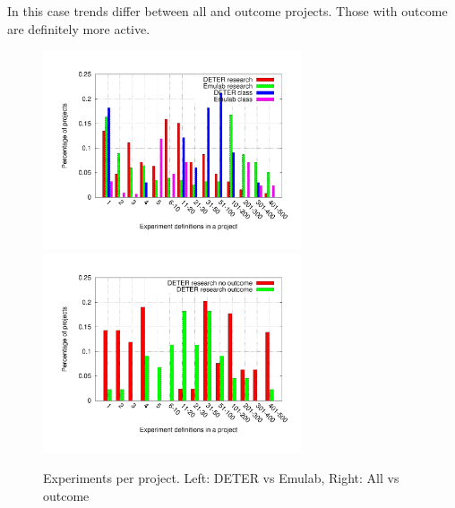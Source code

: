In this case trends differ between all and outcome projects. Those with
outcome are definitely more active. \begin{figure}[htbp] \begin{center}
\includegraphics[width=3in,
type=pdf,ext=.pdf,read=.pdf]{figs/proj.size.gnu}
\includegraphics[width=3in,
type=pdf,ext=.pdf,read=.pdf]{figs/proj.size.cmp.gnu}
\caption{Experiments per project. Left: DETER vs Emulab, Right: All vs
outcome} \label{projsize} \end{center} \end{figure}

